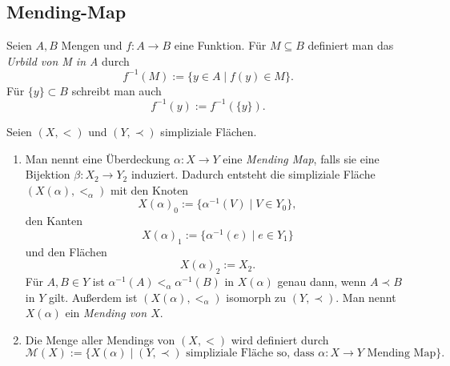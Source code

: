 \documentclass[12pt,titlepage]{article}
\begin{document}
 \subsection{Mending-Map}
\begin{bemerkung}
Seien $A,B$ Mengen und $f:A \to B$ eine Funktion. Für $M \subseteq B$ definiert man das \emph{Urbild von M in A} durch 
\[
f^{-1}(M):=\{y\in A \mid f(y)\in M\}.
\]
Für $\{y\} \subset B$ schreibt man auch
\[
f^{-1}(y):=f^{-1}(\{y\}).
\]
\end{bemerkung}
  \begin{definition}
  Seien $(X,<)$ und $(Y,\prec)$ simpliziale Flächen.
  \begin{enumerate}
  \item Man nennt eine Überdeckung $\alpha:X \to Y$ eine \emph{Mending Map}, falls sie eine Bijektion $\beta : X_{2}\to Y_{2}$ induziert. Dadurch entsteht die simpliziale Fläche $(X(\alpha),<_{\alpha})$ mit den Knoten
  \[
X(\alpha)_0:=\{\alpha^{-1}(V)\mid V \in Y_0 \},
  \] 
  den Kanten 
  \[
X(\alpha)_1:=\{\alpha^{-1}(e)\mid e \in Y_1 \} 
  \]
 und den Flächen 
  \[
X(\alpha)_2:=X_2  .
  \]
  Für $A,B \in Y$ ist $\alpha^{-1}(A)<_{\alpha}\alpha^{-1}(B)$ in $X(\alpha)$ genau dann, wenn $A \prec B  $ in $Y$ gilt. Außerdem ist $(X(\alpha),<_{\alpha})$ isomorph zu $(Y,\prec)$. Man nennt $X(\alpha)$ ein \emph{Mending von $X$}.

  \item Die Menge aller Mendings von $(X,<)$ wird definiert durch 
\[
\mathcal{M}(X):=\{X(\alpha )\mid
 \text{$(Y,\prec )$ simpliziale Fläche so, dass  $\alpha : X \to Y$ Mending Map}
 \}  .
\]

  \end{enumerate}
  \end{definition}
  
\end{document}
